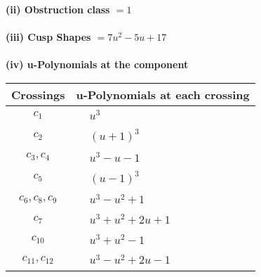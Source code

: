 \documentclass[1p]{elsarticle_modified}
\theoremstyle{definition}
\begin{document}
\flushleft \textbf{(ii) Obstruction class $= 1$}\\~\\
\flushleft \textbf{(iii) Cusp Shapes $= 7 u^2-5 u+17$}\\~\\
\newpage\renewcommand{\arraystretch}{1}
\flushleft \textbf{(iv) u-Polynomials at the component}\newline \\
\begin{tabular}{m{50pt}|m{274pt}}
Crossings & \hspace{64pt}u-Polynomials at each crossing \\
\hline $$\begin{aligned}c_{1}\end{aligned}$$&$\begin{aligned}
&u^3
\end{aligned}$\\
\hline $$\begin{aligned}c_{2}\end{aligned}$$&$\begin{aligned}
&(u+1)^3
\end{aligned}$\\
\hline $$\begin{aligned}c_{3},c_{4}\end{aligned}$$&$\begin{aligned}
&u^3- u-1
\end{aligned}$\\
\hline $$\begin{aligned}c_{5}\end{aligned}$$&$\begin{aligned}
&(u-1)^3
\end{aligned}$\\
\hline $$\begin{aligned}c_{6},c_{8},c_{9}\end{aligned}$$&$\begin{aligned}
&u^3- u^2+1
\end{aligned}$\\
\hline $$\begin{aligned}c_{7}\end{aligned}$$&$\begin{aligned}
&u^3+u^2+2 u+1
\end{aligned}$\\
\hline $$\begin{aligned}c_{10}\end{aligned}$$&$\begin{aligned}
&u^3+u^2-1
\end{aligned}$\\
\hline $$\begin{aligned}c_{11},c_{12}\end{aligned}$$&$\begin{aligned}
&u^3- u^2+2 u-1
\end{aligned}$\\
\hline
\end{tabular}\\~\\
\end{document}
